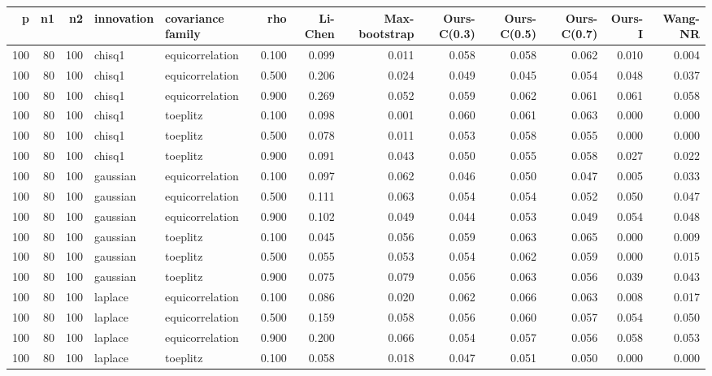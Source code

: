 \begin{tabular}{rrrllrrrrrrrr}
\toprule
p & n1 & n2 & innovation & covariance family & rho & Li-Chen & Max-bootstrap & Ours-C(0.3) & Ours-C(0.5) & Ours-C(0.7) & Ours-I & Wang-NR \\
\midrule
100 & 80 & 100 & chisq1 & equicorrelation & 0.100 & 0.099 & 0.011 & 0.058 & 0.058 & 0.062 & 0.010 & 0.004 \\
100 & 80 & 100 & chisq1 & equicorrelation & 0.500 & 0.206 & 0.024 & 0.049 & 0.045 & 0.054 & 0.048 & 0.037 \\
100 & 80 & 100 & chisq1 & equicorrelation & 0.900 & 0.269 & 0.052 & 0.059 & 0.062 & 0.061 & 0.061 & 0.058 \\
100 & 80 & 100 & chisq1 & toeplitz & 0.100 & 0.098 & 0.001 & 0.060 & 0.061 & 0.063 & 0.000 & 0.000 \\
100 & 80 & 100 & chisq1 & toeplitz & 0.500 & 0.078 & 0.011 & 0.053 & 0.058 & 0.055 & 0.000 & 0.000 \\
100 & 80 & 100 & chisq1 & toeplitz & 0.900 & 0.091 & 0.043 & 0.050 & 0.055 & 0.058 & 0.027 & 0.022 \\
100 & 80 & 100 & gaussian & equicorrelation & 0.100 & 0.097 & 0.062 & 0.046 & 0.050 & 0.047 & 0.005 & 0.033 \\
100 & 80 & 100 & gaussian & equicorrelation & 0.500 & 0.111 & 0.063 & 0.054 & 0.054 & 0.052 & 0.050 & 0.047 \\
100 & 80 & 100 & gaussian & equicorrelation & 0.900 & 0.102 & 0.049 & 0.044 & 0.053 & 0.049 & 0.054 & 0.048 \\
100 & 80 & 100 & gaussian & toeplitz & 0.100 & 0.045 & 0.056 & 0.059 & 0.063 & 0.065 & 0.000 & 0.009 \\
100 & 80 & 100 & gaussian & toeplitz & 0.500 & 0.055 & 0.053 & 0.054 & 0.062 & 0.059 & 0.000 & 0.015 \\
100 & 80 & 100 & gaussian & toeplitz & 0.900 & 0.075 & 0.079 & 0.056 & 0.063 & 0.056 & 0.039 & 0.043 \\
100 & 80 & 100 & laplace & equicorrelation & 0.100 & 0.086 & 0.020 & 0.062 & 0.066 & 0.063 & 0.008 & 0.017 \\
100 & 80 & 100 & laplace & equicorrelation & 0.500 & 0.159 & 0.058 & 0.056 & 0.060 & 0.057 & 0.054 & 0.050 \\
100 & 80 & 100 & laplace & equicorrelation & 0.900 & 0.200 & 0.066 & 0.054 & 0.057 & 0.056 & 0.058 & 0.053 \\
100 & 80 & 100 & laplace & toeplitz & 0.100 & 0.058 & 0.018 & 0.047 & 0.051 & 0.050 & 0.000 & 0.000 \\

\end{tabular}
